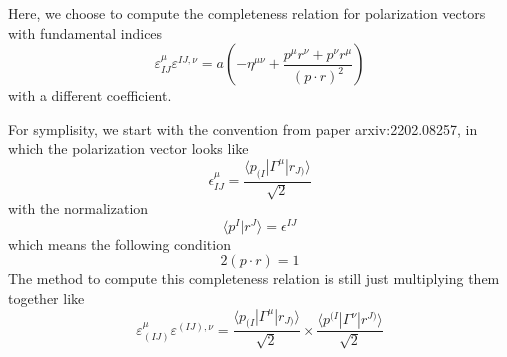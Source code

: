 \documentclass[12pt]{article}
\newcommand{\aket}[1]{|#1\rangle}
\newcommand{\abra}[1]{\langle #1|}
\newcommand{\inner}[2]{\langle #1 | #2 \rangle}
\begin{document}
Here, we choose to compute the completeness relation for polarization vectors with fundamental indices
\begin{equation}
    \varepsilon_{IJ}^\mu \varepsilon^{IJ,\nu}=a(-\eta^{\mu\nu}+\frac{p^\mu r^\nu+p^\nu r^\mu}{(p\cdot r)^2})
\end{equation}
with a different coefficient.

For symplisity, we start with the convention from paper arxiv:2202.08257, in which the polarization vector looks like
\begin{equation}
    \epsilon_{IJ}^\mu=\frac{\abra{p_{(I}}\Gamma^\mu \aket{r_{J)}}}{\sqrt{2}}
\end{equation}
with the normalization
\begin{equation}
    \inner{p^I}{r^J}=\epsilon^{IJ}
    \label{22}
\end{equation}
which means the following condition
\begin{equation}
    2(p\cdot r)=1
\end{equation}
The method to compute this completeness relation is still just multiplying them together like
\begin{equation}
    \varepsilon_{(IJ)}^\mu \varepsilon^{(IJ),\nu}=\frac{\abra{p_{(I}}\Gamma^\mu\aket{r_{J)}}}{\sqrt{2}}\times \frac{\abra{p^{(I}}\Gamma^\nu\aket{r^{J)}}}{\sqrt{2}}
\end{equation}
\end{document}
